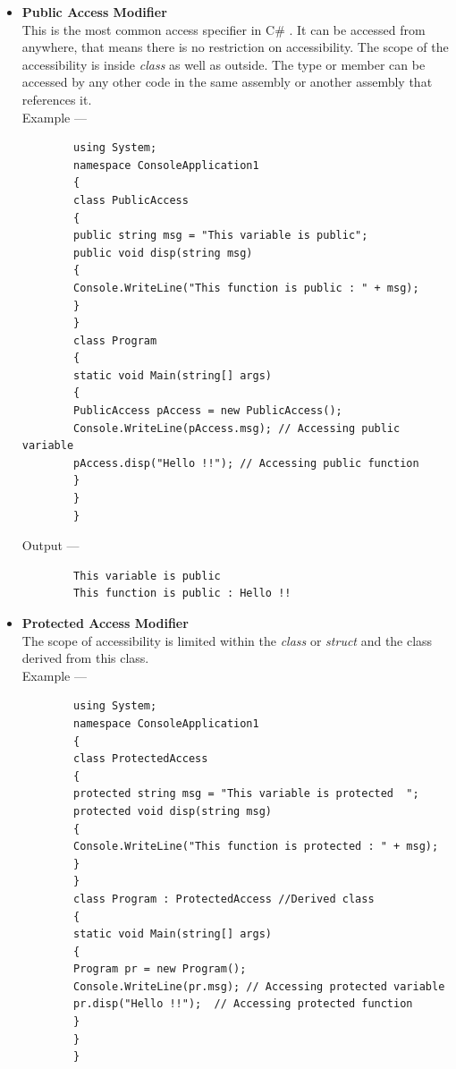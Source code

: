 \documentclass[11pt,dvipsnames,cmyk]{article}
\begin{document}
\begin{itemize}
	 	\item \textbf{Public Access Modifier}
	 	\\This is the most common access specifier in C\# . It can be accessed from anywhere, that means there is no restriction on accessibility. The scope of the accessibility is inside \emph{class} as well as outside. The type or member can be accessed by any other code in the same assembly or another assembly that references it.
	 	\\Example ---
	 	\begin{verbatim}
	 	using System;
	 	namespace ConsoleApplication1
	 	{
	 	class PublicAccess
	 	{
	 	public string msg = "This variable is public";
	 	public void disp(string msg)
	 	{
	 	Console.WriteLine("This function is public : " + msg);
	 	}
	 	}
	 	class Program
	 	{
	 	static void Main(string[] args)
	 	{
	 	PublicAccess pAccess = new PublicAccess();
	 	Console.WriteLine(pAccess.msg); // Accessing public variable
	 	pAccess.disp("Hello !!"); // Accessing public function
	 	}
	 	}
	 	}
	 	\end{verbatim}
	 	Output ---
	 	\begin{verbatim}
	 	This variable is public
	 	This function is public : Hello !!
	 	\end{verbatim}
	 	
	 	\item \textbf{Protected Access Modifier}
	 	\\The scope of accessibility is limited within the \emph{class} or \emph{struct} and the class derived from this class.
	 	\\Example ---
	 	\begin{verbatim}
	 	using System;
	 	namespace ConsoleApplication1
	 	{
	 	class ProtectedAccess
	 	{
	 	protected string msg = "This variable is protected  ";
	 	protected void disp(string msg)
	 	{
	 	Console.WriteLine("This function is protected : " + msg);
	 	}
	 	}
	 	class Program : ProtectedAccess	//Derived class
	 	{
	 	static void Main(string[] args)
	 	{
	 	Program pr = new Program();
	 	Console.WriteLine(pr.msg); // Accessing protected variable
	 	pr.disp("Hello !!");  // Accessing protected function
	 	}
	 	}
	 	}
	 	\end{verbatim}
	 	

\end{itemize}
\end{document}
